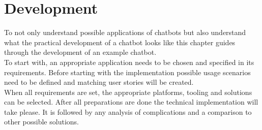 \chapter{Development}


To not only understand possible applications of chatbots but also understand what the practical development of a chatbot looks like this chapter guides through the development of an example chatbot.
\\

To start with, an appropriate application needs to be chosen and specified in its requirements.
Before starting with the implementation possible usage scenarios need to be defined and matching user stories will be created.
\\
When all requirements are set, the appropriate platforms, tooling and solutions can be selected.
After all preparations are done the technical implementation will take please.
It is followed by any analysis of complications and a comparison to other possible solutions.

